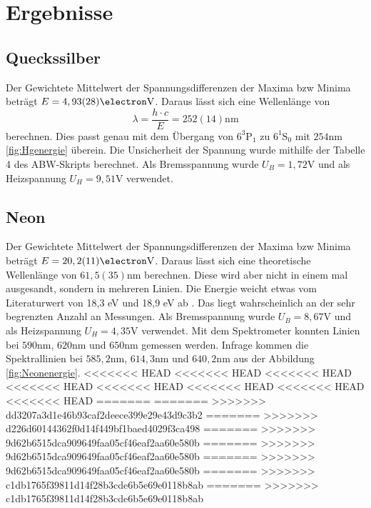 \documentclass[11pt, a4paper]{article}
\begin{document}
    \section{Ergebnisse}

    \subsection{Queckssilber}

    Der Gewichtete Mittelwert der Spannungsdifferenzen der Maxima bzw Minima beträgt $E = 4,93(28) \si{\electron\volt}$. Daraus lässt sich eine Wellenlänge von 
    \begin{equation}
        \lambda = \frac{h \cdot c}{E} = 252(14) \si{\nano\meter}
    \end{equation}
    berechnen. Dies passt genau mit dem Übergang von $6^3\text{P}_1$ zu $6^1\text{S}_0$ mit $254 \si{\nano\meter}$ \ref{fig:Hgenergie} überein.
    Die Unsicherheit der Spannung wurde mithilfe der Tabelle 4 des ABW-Skripts \cite{ABW} berechnet. Als Bremsspannung wurde $U_B = 1,72 \si{\volt}$ und als Heizspannung $U_H = 9,51 \si{\volt}$ verwendet.

    \subsection{Neon}

    Der Gewichtete Mittelwert der Spannungsdifferenzen der Maxima bzw Minima beträgt $E = 20,2(11) \si{\electron\volt}$. Daraus lässt sich eine theoretische Wellenlänge von $61,5(35) \si{\nano\meter}$ berechnen. Diese wird aber nicht in einem mal ausgesandt, sondern in mehreren Linien. Die Energie weicht etwas vom Literaturwert von 18,3 eV und 18,9 eV ab \cite{FHV}. Das liegt wahrscheinlich an der sehr begrenzten Anzahl an Messungen.
    Als Bremsspannung wurde $U_B = 8,67 \si{\volt}$ und als Heizspannung $U_H = 4,35 \si{\volt}$ verwendet.
    Mit dem Spektrometer konnten Linien bei $590 \si{\nano\meter}$, $620 \si{\nano\meter}$ und $650 \si{\nano\meter}$ gemessen werden. Infrage kommen die Spektrallinien bei $585,2 \si{\nano\meter}$, $614,3 \si{\nano\meter}$ und $640,2 \si{\nano\meter}$ aus der Abbildung \ref{fig:Neonenergie}.
<<<<<<< HEAD
<<<<<<< HEAD
<<<<<<< HEAD
<<<<<<< HEAD
<<<<<<< HEAD
<<<<<<< HEAD
<<<<<<< HEAD
<<<<<<< HEAD
=======
=======
>>>>>>> dd3207a3d1e46b93caf2deece399e29e43d9c3b2
=======
>>>>>>> d226d60144362f0d14f449bf1baed4029f3ca498
=======
>>>>>>> 9d62b6515dca909649faa05cf46eaf2aa60e580b
=======
>>>>>>> 9d62b6515dca909649faa05cf46eaf2aa60e580b
=======
>>>>>>> 9d62b6515dca909649faa05cf46eaf2aa60e580b
=======
>>>>>>> c1db1765f39811d14f28b3cde6b5e69e0118b8ab
=======
>>>>>>> c1db1765f39811d14f28b3cde6b5e69e0118b8ab
\end{document}
